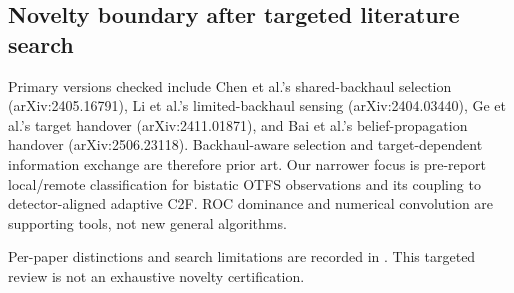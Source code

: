 \documentclass[10pt]{article}
\begin{document}
\subsection{Novelty boundary after targeted literature search}
Primary versions checked include Chen et al.'s shared-backhaul selection
(arXiv:2405.16791), Li et al.'s limited-backhaul sensing (arXiv:2404.03440),
Ge et al.'s target handover (arXiv:2411.01871), and Bai et al.'s
belief-propagation handover (arXiv:2506.23118). Backhaul-aware selection and
target-dependent information exchange are therefore prior art.
Our narrower focus is pre-report local/remote classification for bistatic
OTFS observations and its coupling to detector-aligned adaptive C2F.
ROC dominance and numerical convolution are supporting tools, not new
general algorithms.

Per-paper distinctions and search limitations are recorded in
.
This targeted review is not an exhaustive novelty certification.
\end{document}
